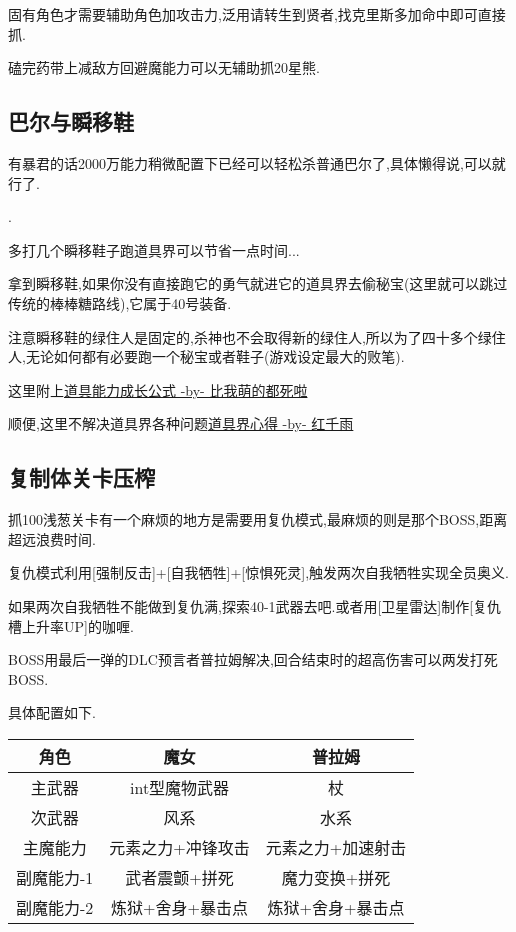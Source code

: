 		固有角色才需要辅助角色加攻击力,泛用请转生到贤者,找克里斯多加命中即可直接抓.

		磕完药带上减敌方回避魔能力可以无辅助抓20星熊.

		\subsection{巴尔与瞬移鞋}

		有暴君的话2000万能力稍微配置下已经可以轻松杀普通巴尔了,具体懒得说,可以就行了.

		{\color{red}{即便没有这里也建议用2000万能力挑战下,整个游戏挑战关已经没几个了,如果觉得困难可以参考后面修罗篇的巴尔攻略}}.

		多打几个瞬移鞋子跑道具界可以节省一点时间...

		拿到瞬移鞋,如果你没有直接跑它的勇气就进它的道具界去偷秘宝(这里就可以跳过传统的棒棒糖路线),它属于40号装备.

		注意瞬移鞋的绿住人是固定的,杀神也不会取得新的绿住人,所以为了四十多个绿住人,无论如何都有必要跑一个秘宝或者鞋子(游戏设定最大的败笔).

		这里附上\href{http://tieba.baidu.com/f?kz=3834692385}{道具能力成长公式 -by- 比我萌的都死啦}

		顺便,这里不解决道具界各种问题\href{http://tieba.baidu.com/p/3730196003}{道具界心得 -by- 红千雨}

		\subsection{复制体关卡压榨}

		抓100浅葱关卡有一个麻烦的地方是需要用复仇模式,最麻烦的则是那个BOSS,距离超远浪费时间.

		复仇模式利用[强制反击]+[自我牺牲]+[惊惧死灵],触发两次自我牺牲实现全员奥义.

		如果两次自我牺牲不能做到复仇满,探索40-1武器去吧.或者用[卫星雷达]制作[复仇槽上升率UP]的咖喱.

		BOSS用最后一弹的DLC预言者普拉姆解决,回合结束时的超高伤害可以两发打死BOSS.

		具体配置如下.

		\begin{center}
			\begin{tabular}
			{| c | c | c |}
			\hline
			角色 & 魔女 & 普拉姆\\
			\hline
			主武器 & int型魔物武器 & 杖\\
			\hline
			次武器 & 风系 & 水系 \\
			\hline
			主魔能力 & 元素之力+冲锋攻击 & 元素之力+加速射击\\
			\hline
			副魔能力-1 & 武者震颤+拼死 & 魔力变换+拼死\\
			\hline
			副魔能力-2 & 炼狱+舍身+暴击点 & 炼狱+舍身+暴击点\\
			\hline
			\end{tabular}
		\end{center}

